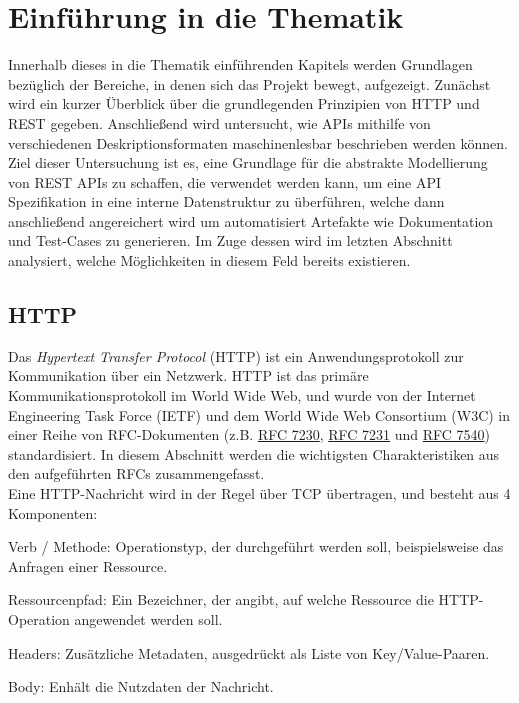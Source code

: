
\section{Einführung in die Thematik}

Innerhalb dieses in die Thematik einführenden Kapitels werden Grundlagen bezüglich der Bereiche, in denen sich das Projekt bewegt, aufgezeigt. Zunächst wird ein kurzer Überblick über die grundlegenden Prinzipien von HTTP und REST gegeben. Anschließend wird untersucht, wie APIs mithilfe von verschiedenen Deskriptionsformaten maschinenlesbar beschrieben werden können. Ziel dieser Untersuchung ist es, eine Grundlage für die abstrakte Modellierung von REST APIs zu schaffen, die verwendet werden kann, um eine API Spezifikation in eine interne Datenstruktur zu überführen, welche dann anschließend angereichert wird um automatisiert Artefakte wie Dokumentation und Test-Cases zu generieren. Im Zuge dessen wird im letzten Abschnitt analysiert, welche Möglichkeiten in diesem Feld bereits existieren.

\subsection{HTTP}

Das \emph{Hypertext Transfer Protocol} (HTTP) ist ein Anwendungsprotokoll zur Kommunikation über ein Netzwerk. HTTP ist das primäre Kommunikationsprotokoll im World Wide Web, und wurde von der Internet Engineering Task Force (IETF) und dem World Wide Web Consortium (W3C) in einer Reihe von RFC-Dokumenten (z.B. \href{https://tools.ietf.org/html/rfc7230}{RFC 7230}, \href{https://tools.ietf.org/html/rfc7231}{RFC 7231} und \href{https://tools.ietf.org/html/rfc7540}{RFC 7540}) standardisiert. In diesem Abschnitt werden die wichtigsten Charakteristiken aus den aufgeführten RFCs zusammengefasst. \\

Eine HTTP-Nachricht wird in der Regel über TCP übertragen, und besteht aus 4 Komponenten:

\begin{description}
	\item Verb / Methode: Operationstyp, der durchgeführt werden soll, beispielsweise das Anfragen einer Ressource.
    \item Ressourcenpfad: Ein Bezeichner, der angibt, auf welche Ressource die HTTP-Operation angewendet werden soll.
    \item Headers: Zusätzliche Metadaten, ausgedrückt als Liste von Key/Value-Paaren.
    \item Body: Enhält die Nutzdaten der Nachricht.
\end{description}

